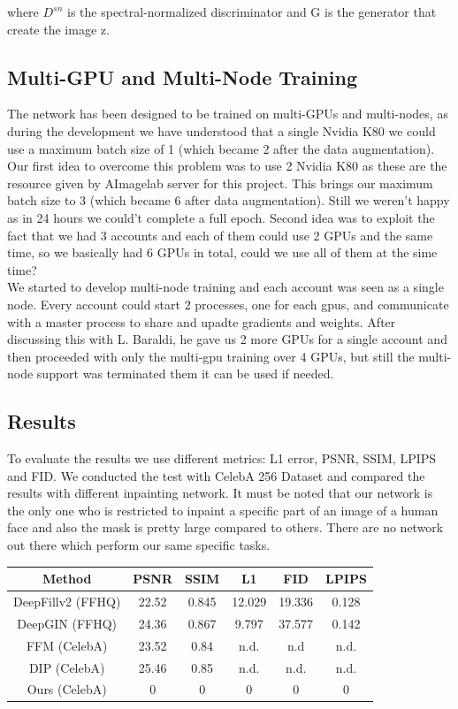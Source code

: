 \documentclass[10pt,twocolumn,letterpaper]{article}
\begin{document}
where \(D^{sn}\) is the spectral-normalized discriminator and G is the generator that create the image z.

\subsection{Multi-GPU and Multi-Node Training}
The network has been designed to be trained on multi-GPUs and multi-nodes, as during the development we have understood that a single Nvidia K80  we could use a maximum batch size of 1 (which became 2 after the data augmentation). Our first idea to overcome this problem was to use 2 Nvidia K80 as these are the resource given by AImagelab server for this project. This brings our maximum batch size to 3 (which became 6 after data augmentation). Still we weren't happy as in 24 hours we could't complete a full epoch. Second idea was to exploit the fact that we had 3 accounts and each of them could use 2 GPUs and the same time, so we basically had 6 GPUs in total, could we use all of them at the sime time?\\
We started to develop multi-node training and each account was seen as a single node.
Every account could start 2 processes, one for each gpus, and communicate with a master process to share and upadte gradients and weights.
After discussing this with L. Baraldi, he gave us 2 more GPUs for a single account and then proceeded with only the multi-gpu training over 4 GPUs, but still the multi-node support was terminated them it can be used if needed.

\subsection{Results}
To evaluate the results we use different metrics: L1 error, PSNR, SSIM, LPIPS
and FID. We conducted the test with CelebA 256 Dataset and compared the results
with different inpainting network. It must be noted that our network is the only
one who is restricted to inpaint a specific part of an image of a human face and also the mask
is pretty large compared to others. There are no network out there which perform our same specific tasks.
\begin{center}
  \begin{tabular}{ |c|c|c|c|c|c| }
    \hline
    Method & PSNR & SSIM & L1 & FID & LPIPS \\
    \hline
    DeepFillv2 (FFHQ) & 22.52 & 0.845 & 12.029  & 19.336  & 0.128 \\
    DeepGIN (FFHQ)    & 24.36 & 0.867 & 9.797   & 37.577  & 0.142 \\
    FFM (CelebA)      & 23.52 & 0.84  & n.d.    & n.d     & n.d. \\
    DIP (CelebA)      & 25.46 & 0.85  & n.d.    & n.d.    & n.d. \\
    Ours (CelebA)     & 0     & 0     & 0       & 0       & 0 \\
  \hline
  \end{tabular}
\end{center}
\end{document}
